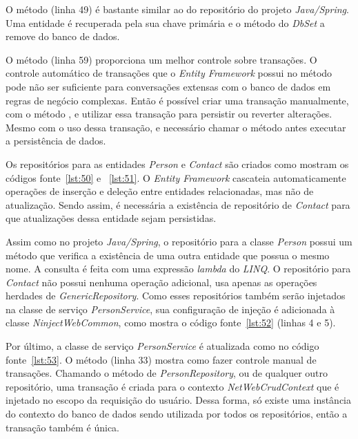 O método  (linha 49) é bastante similar ao do repositório do projeto \textit{Java/Spring}. Uma entidade é recuperada pela sua chave primária e o método  do \textit{DbSet} a remove do banco de dados.

O método  (linha 59) proporciona um melhor controle sobre transações. O controle automático de transações que o \textit{Entity Framework} possui no método  pode não ser suficiente para conversações extensas com o banco de dados em regras de negócio complexas. Então é possível criar uma transação manualmente, com o método , e utilizar essa transação para persistir ou reverter alterações. Mesmo com o uso dessa transação, e necessário chamar o método  antes executar a persistência de dados.

Os repositórios para as entidades \textit{Person} e \textit{Contact} são criados como mostram os códigos fonte~\ref{lst:50} e ~\ref{lst:51}. O \textit{Entity Framework} cascateia automaticamente operações de inserção e deleção entre entidades relacionadas, mas não de atualização. Sendo assim, é necessária a existência de repositório de \textit{Contact} para que atualizações dessa entidade sejam persistidas.



Assim como no projeto \textit{Java/Spring}, o repositório para a classe \textit{Person} possui um método que verifica a existência de uma outra entidade que possua o mesmo nome. A consulta é feita com uma expressão \textit{lambda} do \textit{LINQ}. O repositório para \textit{Contact} não possui nenhuma operação adicional, usa apenas as operações herdades de \textit{GenericRepository}. Como esses repositórios também serão injetados na classe de serviço \textit{PersonService}, sua configuração de injeção é adicionada à classe \textit{NinjectWebCommon}, como mostra o código fonte~\ref{lst:52} (linhas 4 e 5).


Por último, a classe de serviço \textit{PersonService} é atualizada como no código fonte~\ref{lst:53}. O método  (linha 33) mostra como fazer controle manual de transações. Chamando o método  de \textit{PersonRepository}, ou de qualquer outro repositório, uma transação é criada para o contexto \textit{NetWebCrudContext} que é injetado no escopo da requisição do usuário. Dessa forma, só existe uma instância do contexto do banco de dados sendo utilizada por todos os repositórios, então a transação também é única.

